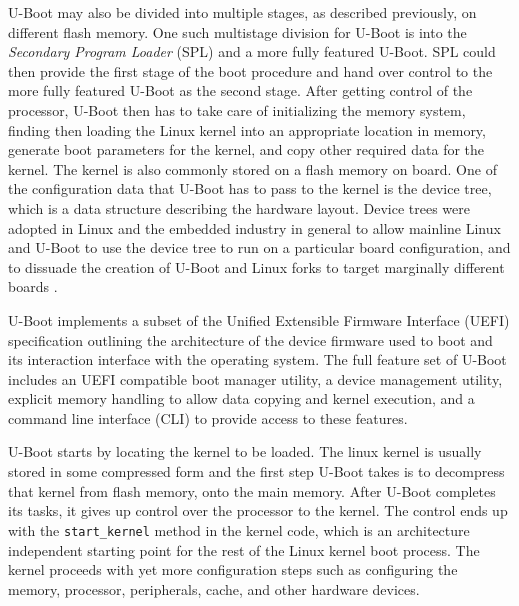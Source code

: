 U-Boot may also be divided into multiple stages, as described previously, on different flash memory. One such multistage division for U-Boot is into the \textit{Secondary Program Loader} (SPL) and a more fully featured U-Boot. SPL could then provide the first stage of the boot procedure and hand over control to the more fully featured U-Boot as the second stage. After getting control of the processor, U-Boot then has to take care of initializing the memory system, finding then loading the Linux kernel into an appropriate location in memory, generate boot parameters for the kernel, and copy other required data for the kernel. The kernel is also commonly stored on a flash memory on board. One of the configuration data that U-Boot has to pass to the kernel is the device tree, which is a data structure describing the hardware layout. Device trees were adopted in Linux and the embedded industry in general to allow mainline Linux and U-Boot to use the device tree to run on a particular board configuration, and to dissuade the creation of U-Boot and Linux forks to target marginally different boards \cite{device-tree}.

U-Boot implements a subset of the Unified Extensible Firmware Interface (UEFI) specification outlining the architecture of the device firmware used to boot and its interaction interface with the operating system. The full feature set of U-Boot includes an UEFI compatible boot manager utility, a device management utility, explicit memory handling to allow data copying and kernel execution, and a command line interface (CLI) to provide access to these features.

U-Boot starts by locating the kernel to be loaded. The linux kernel is usually stored in some compressed form and the first step U-Boot takes is to decompress that kernel from flash memory, onto the main memory. After U-Boot completes its tasks, it gives up control over the processor to the kernel. The control ends up with the \texttt{start\_kernel} method in the kernel code, which is an architecture independent starting point for the rest of the Linux kernel boot process. The kernel proceeds with yet more configuration steps such as configuring the memory, processor, peripherals, cache, and other hardware devices.

